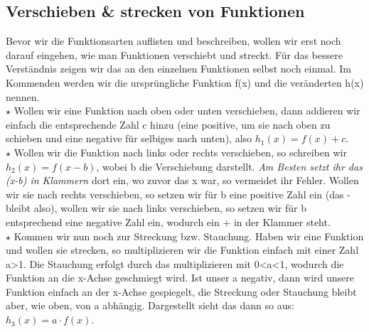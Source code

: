 \subsection{Verschieben \& strecken von Funktionen}
	Bevor wir die Funktionsarten auflisten und beschreiben, wollen wir erst noch
	darauf eingehen, wie man Funktionen verschiebt und streckt. Für das bessere
	Verständnis zeigen wir das an den einzelnen Funktionen selbst noch einmal. Im
	Kommenden werden wir die ursprüngliche Funktion f(x) und die veränderten h(x)
	nennen.\\

	\(\star\) Wollen wir eine Funktion nach oben oder unten verschieben, dann
	addieren wir einfach die entsprechende Zahl c hinzu (eine positive, um sie nach
	oben zu schieben und eine negative für selbiges nach unten), also
	\(h_1(x)=f(x)+c\).\\

	\(\star\) Wollen wir die Funktion nach links oder rechts verschieben, so
	schreiben wir \(h_2(x)=f(x-b)\), wobei b die Verschiebung darstellt. \textit{Am
	Besten setzt ihr das (x-b) in Klammern} dort ein, wo zuvor das x war, so
	vermeidet ihr Fehler. Wollen wir sie nach rechts verschieben, so setzen wir für
	b eine positive Zahl ein (das - bleibt also), wollen wir sie nach links
	verschieben, so setzen wir für b entsprechend eine negative Zahl ein, wodurch
	ein + in der Klammer steht.\\

	\(\star\) Kommen wir nun noch zur Streckung bzw. Stauchung. Haben wir eine
	Funktion und wollen sie strecken, so multiplizieren wir die Funktion einfach
	mit einer Zahl a>1. Die Stauchung erfolgt durch das multiplizieren mit 0<a<1,
	wodurch die Funktion an die x-Achse geschmiegt wird. Ist unser a negativ, dann
	wird unsere Funktion einfach an der x-Achse gespiegelt, die Streckung oder
	Stauchung bleibt aber, wie oben, von a abhängig. Dargestellt sieht das dann so
	aus: \(h_3(x)=a\cdot f(x)\).
